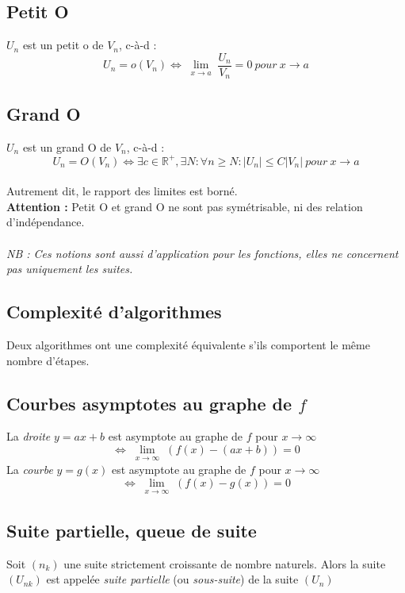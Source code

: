 \documentclass[british,french,11pt, a4paper, openany]{book}
\begin{document}
\subsection*{Petit O}
$U_{n}$ est un petit o de $V_{n}$, c-à-d :\\ 
$$U_{n} = o(V_{n}) \Leftrightarrow \lim\limits_{\substack{x \to a}} \frac{U_{n}}{V_{n}} = 0\ pour\ x \rightarrow a$$
\subsection*{Grand O}
$U_{n}$ est un grand O de $V_{n}$, c-à-d :
$$U_{n} = O(V_{n}) \Leftrightarrow \exists c \in \mathbb{R}^{+}, \exists N : \forall n \geq N : |U_{n}| \leq C|V_{n}|\ pour\ x \rightarrow a$$ \\
Autrement dit, le rapport des limites est borné.\\
\textbf{Attention : } Petit O et grand O ne sont pas symétrisable, ni des relation d'indépendance.\\
\\
\textit{NB : Ces notions sont aussi d'application pour les fonctions, elles ne concernent pas uniquement les suites.}

\subsection{Complexité d'algorithmes}
Deux algorithmes ont une complexité équivalente s'ils comportent le même nombre d'étapes.

\subsection{Courbes asymptotes au graphe de $f$}
La \textit{droite} $y = ax + b$ est asymptote au graphe de $f$ pour $x \rightarrow \infty$ 
$$ \Leftrightarrow \lim\limits_{\substack{x \to \infty}} (f(x) - (ax+b)) = 0$$
La \textit{courbe} $y=g(x)$ est asymptote au graphe de $f$ pour $x \rightarrow \infty$ 
$$ \Leftrightarrow \lim\limits_{\substack{x \to \infty}} (f(x) - g(x)) = 0$$

\subsection{Suite partielle, queue de suite}
Soit $(n_{k})$ une suite strictement croissante de nombre naturels. Alors la suite $(U_{nk})$ est appelée \textit{suite partielle} (ou \textit{sous-suite}) de la suite $(U_{n})$
\end{document}
